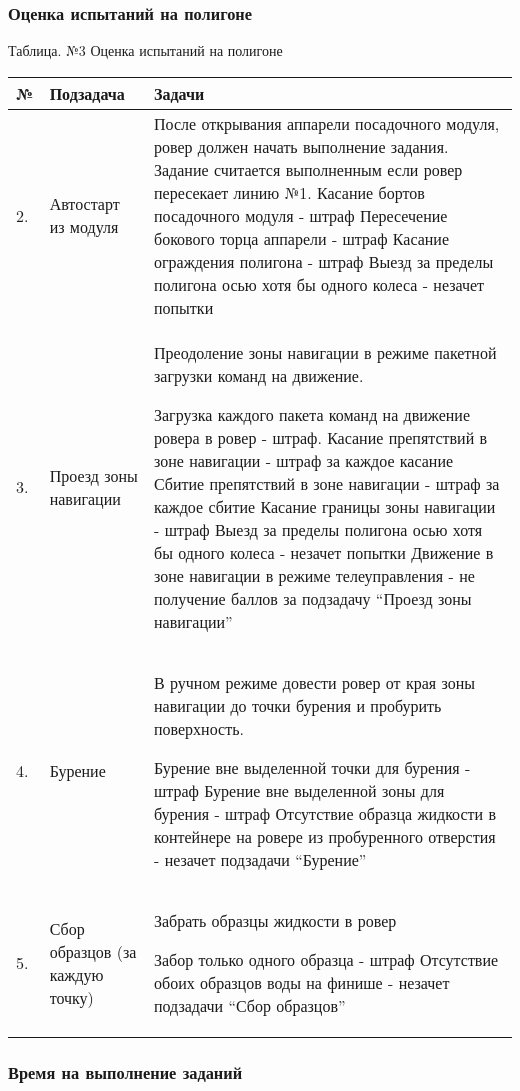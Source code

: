 \subsubsection*{Оценка испытаний на полигоне}

\begin{center}
    Таблица. №3 Оценка испытаний на полигоне
\end{center}
\begin{tabular}{|p{0.5cm}|p{3.5cm}|p{10.5cm}|}
    \hline
    № & Подзадача & Задачи \\
    \hline
    2. & Автостарт из модуля & После открывания аппарели посадочного модуля, ровер должен начать выполнение задания. Задание считается выполненным если ровер пересекает линию №1.
    Касание бортов посадочного модуля - штраф 
    Пересечение бокового торца аппарели - штраф Касание ограждения полигона - штраф
    Выезд за пределы полигона осью хотя бы одного колеса - незачет попытки \\
    \hline
    3. & Проезд зоны навигации & Преодоление зоны навигации в режиме пакетной загрузки команд на движение.

    Загрузка каждого пакета команд на движение ровера в ровер - штраф.
    Касание препятствий в зоне навигации - штраф за каждое касание
    Сбитие препятствий в зоне навигации - штраф за каждое сбитие
    Касание границы зоны навигации - штраф
    Выезд за пределы полигона осью хотя бы одного колеса - незачет попытки
    Движение в зоне навигации в режиме телеуправления - не получение баллов за подзадачу “Проезд зоны навигации” \\
    \hline
    4. & Бурение & 	В ручном режиме довести ровер от края зоны навигации до точки бурения и пробурить поверхность. 

    Бурение вне выделенной точки для бурения - штраф 
    Бурение вне выделенной зоны для бурения - штраф
    Отсутствие образца жидкости в контейнере на ровере из пробуренного отверстия - незачет подзадачи “Бурение” \\
    \hline
            5. & Сбор образцов
    (за каждую точку) & Забрать образцы жидкости в ровер

    Забор только одного образца - штраф
    Отсутствие обоих образцов воды на финише - незачет подзадачи “Сбор образцов” \\
    \hline
\end{tabular}

\subsubsection*{Время на выполнение заданий}

